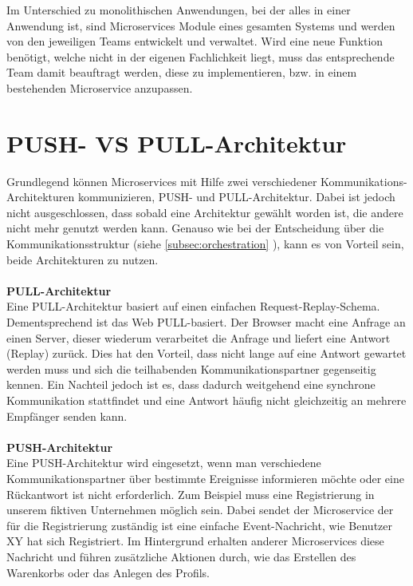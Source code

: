 Im Unterschied zu monolithischen Anwendungen, bei der alles in einer Anwendung ist, sind Microservices Module eines gesamten Systems und werden von den jeweiligen Teams entwickelt und verwaltet. Wird eine neue Funktion benötigt, welche nicht in der eigenen Fachlichkeit liegt, muss das entsprechende Team damit beauftragt werden, diese zu implementieren, bzw. in einem bestehenden Microservice anzupassen.

\section{PUSH- VS PULL-Architektur}
\label{sec:PushPullArchitektur}
Grundlegend können Microservices mit Hilfe zwei verschiedener Kommunikations-Architekturen kommunizieren, PUSH- und PULL-Architektur. Dabei ist jedoch nicht ausgeschlossen, dass sobald eine Architektur gewählt worden ist, die andere nicht mehr genutzt werden kann. Genauso wie bei der Entscheidung über die Kommunikationsstruktur (siehe \ref{subsec:orchestration} ), kann es von Vorteil sein, beide Architekturen zu nutzen.
\\\\
\textbf{PULL-Architektur}\\
Eine PULL-Architektur basiert auf einen einfachen Request-Replay-Schema. Dementsprechend ist das Web PULL-basiert.
Der Browser macht eine Anfrage an einen Server, dieser wiederum verarbeitet die Anfrage und liefert eine Antwort (Replay) zurück. Dies hat den Vorteil, dass nicht lange auf eine Antwort gewartet werden muss und sich die teilhabenden Kommunikationspartner gegenseitig kennen. Ein Nachteil jedoch ist es, dass dadurch weitgehend eine synchrone Kommunikation stattfindet und eine Antwort häufig nicht gleichzeitig an mehrere Empfänger senden kann.
\\\\
\textbf{PUSH-Architektur}\\
Eine PUSH-Architektur wird eingesetzt, wenn man verschiedene Kommunikationspartner über bestimmte Ereignisse informieren möchte oder eine Rückantwort ist nicht erforderlich. Zum Beispiel muss eine Registrierung in unserem fiktiven Unternehmen möglich sein. Dabei sendet der Microservice der für die Registrierung zuständig ist eine einfache Event-Nachricht, wie Benutzer XY hat sich Registriert. Im Hintergrund erhalten anderer Microservices diese Nachricht und führen zusätzliche Aktionen durch, wie das Erstellen des Warenkorbs oder das Anlegen des Profils.
\\\\
